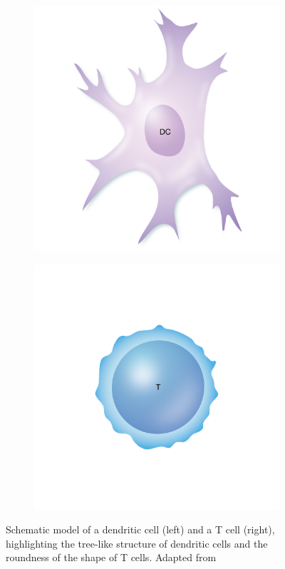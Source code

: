 \begin{figure}[h]
    \centering
    \begin{subfigure}[h!]{0.3\textwidth}
        \includegraphics[width=\textwidth]{dissertation/figures/model_DC.png}
    \end{subfigure}
    \begin{subfigure}[h!]{0.3\textwidth}
        \includegraphics[width=\textwidth]{dissertation/figures/model_Tcell.png}
    \end{subfigure}
    \caption{Schematic model of a dendritic cell (left) and a T cell (right), highlighting the tree-like structure of dendritic cells and the roundness of the shape of T cells. Adapted from \citet{cavanagh2020}}
    \label{fig:schematic_cells}
\end{figure}

